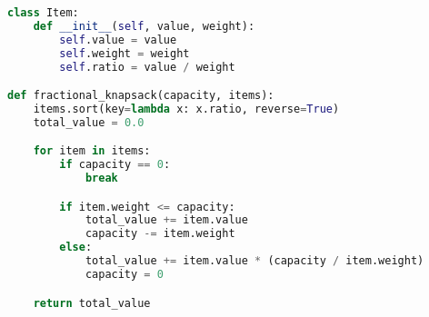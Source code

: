 \begin{lstlisting}[language=Python]
class Item:
    def __init__(self, value, weight):
        self.value = value
        self.weight = weight
        self.ratio = value / weight

def fractional_knapsack(capacity, items):
    items.sort(key=lambda x: x.ratio, reverse=True)
    total_value = 0.0

    for item in items:
        if capacity == 0:
            break

        if item.weight <= capacity:
            total_value += item.value
            capacity -= item.weight
        else:
            total_value += item.value * (capacity / item.weight)
            capacity = 0

    return total_value
\end{lstlisting}

\newpage